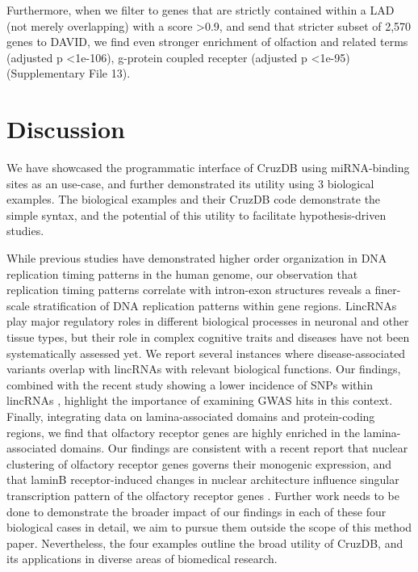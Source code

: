 \documentclass{bioinfo}
\begin{document}
Furthermore, when we filter to genes that are strictly contained within a LAD (not merely overlapping) with a score \textgreater 0.9, and send that stricter subset of 2,570 genes to DAVID, we find even stronger enrichment of olfaction and related terms (adjusted p \textless  1e-106), g-protein coupled recepter (adjusted p \textless  1e-95) (Supplementary File 13).




\section{Discussion}

We have showcased the programmatic interface of CruzDB using miRNA-binding sites as an use-case, and further demonstrated its utility using 3 biological examples.
The biological examples and their CruzDB code demonstrate the simple syntax, and the potential of this utility to facilitate hypothesis-driven studies.

While previous studies have demonstrated higher order organization in DNA replication timing patterns in the human genome, our observation that replication timing patterns correlate with intron-exon structures reveals a finer-scale stratification of DNA replication patterns within gene regions. LincRNAs play major regulatory roles in different biological processes in neuronal and other tissue types, but their role in complex cognitive traits and diseases have not been systematically assessed yet. We report several instances where disease-associated variants overlap with lincRNAs with relevant biological functions. Our findings, combined with the recent study showing a lower incidence of SNPs within lincRNAs \citep{Chen}, highlight the importance of examining GWAS hits in this context. Finally, integrating data on lamina-associated domains and protein-coding regions, we find that olfactory receptor genes are highly enriched in the lamina-associated domains. Our findings are consistent with a recent report that nuclear clustering of olfactory receptor genes governs their monogenic expression, and that laminB receptor-induced changes in nuclear architecture influence singular transcription pattern of the olfactory receptor genes \citep{Clowney}. Further work needs to be done to demonstrate the broader impact of our findings in each of these four biological cases in detail, we aim to pursue them outside the scope of this method paper. Nevertheless, the four examples outline the broad utility of CruzDB, and its applications in diverse areas of biomedical research.
\end{document}
